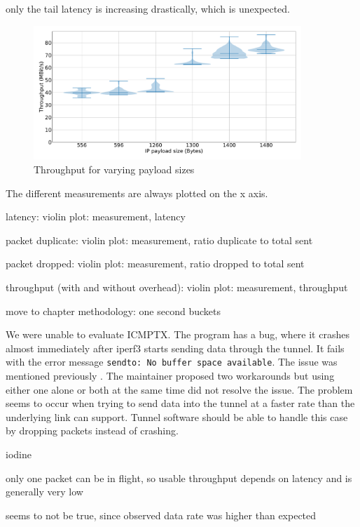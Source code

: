 only the tail latency is increasing drastically, which is unexpected.

\begin{figure}[tbh]
	\centering
	\includegraphics[draft=false,width=0.9\textwidth]{figures/Graphs/graph-1-mtu/throughput.pdf}
	\caption{Throughput for varying payload sizes}\label{fix:graph-1-mtu-throughput}
\end{figure}

The different measurements are always plotted on the x axis.

latency: violin plot: measurement, latency

packet duplicate: violin plot: measurement, ratio duplicate to total sent

packet dropped: violin plot: measurement, ratio dropped to total sent

throughput (with and without overhead): violin plot: measurement, throughput


move to chapter methodology:
one second buckets


We were unable to evaluate ICMPTX.
The program has a bug, where it crashes almost immediately after iperf3 starts sending data through the tunnel.
It fails with the error message \texttt{sendto: No buffer space available}.
The issue was mentioned previously \cite{icmptx-sendto-no-buffer-space-avaiable}.
The maintainer proposed two workarounds but using either one alone or both at the same time did not resolve the issue.
The problem seems to occur when trying to send data into the tunnel at a faster rate than the underlying link can support.
Tunnel software should be able to handle this case by dropping packets instead of crashing.


iodine

only one packet can be in flight, so usable throughput depends on latency and is generally very low

seems to not be true, since observed data rate was higher than expected

